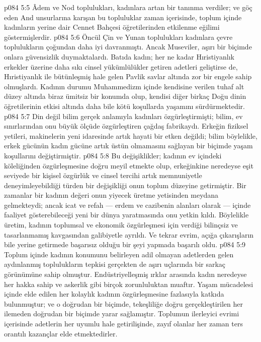 \vs p084 5:5 Âdem ve Nod toplulukları, kadınlara artan bir tanınma verdiler; ve göç eden And unsurlarına karışan bu topluluklar zaman içerisinde, toplum içinde kadınların yerine dair Cennet Bahçesi öğretilerinden etkilenme eğilimi göstermişlerdir.
\vs p084 5:6 Öncül Çin ve Yunan toplulukları kadınlara çevre toplulukların çoğundan daha iyi davranmıştı. Ancak Museviler, aşırı bir biçimde onlara güvensizlik duymaktalardı. Batıda kadın; her ne kadar Hıristiyanlık erkekler üzerine daha sıkı cinsel yükümlülükler getiren adetleri geliştirse de, Hıristiyanlık ile bütünleşmiş hale gelen Pavlik savlar altında zor bir engele sahip olmuşlardı. Kadının durumu Muhammedizm içinde kendisine verilen tuhaf alt düzey altında biraz ümitsiz bir konumda olup, kendisi diğer birkaç Doğu dinin öğretilerinin etkisi altında daha bile kötü koşullarda yaşamını sürdürmektedir.
\vs p084 5:7 Din değil bilim gerçek anlamıyla kadınları özgürleştirmişti; bilim, ev sınırlarından onu büyük ölçüde özgürleştiren çağdaş fabrikaydı. Erkeğin fiziksel yetileri, makinelerin yeni idaresinde artık hayati bir etken değildi; bilim böylelikle, erkek gücünün kadın gücüne artık üstün olmamasını sağlayan bir biçimde yaşam koşullarını değiştirmiştir.
\vs p084 5:8 Bu değişiklikler; kadının ev içindeki köleliğinden özgürleşmesine doğru meyil etmekte olup, erkeğinkine neredeyse eşit seviyede bir kişisel özgürlük ve cinsel tercihi artık memnuniyetle deneyimleyebildiği türden bir değişikliği onun toplum düzeyine getirmiştir. Bir zamanlar bir kadının değeri onun yiyecek üretme yetisinden meydana gelmekteydi; ancak icat ve refah --- erdem ve cazibenin alanları olarak --- içinde faaliyet gösterebileceği yeni bir dünya yaratmasında onu yetkin kıldı. Böylelikle üretim, kadının toplumsal ve ekonomik özgürleşmesi için verdiği bilinçsiz ve tasarlanmamış kavgasından galibiyetle ayrıldı. Ve tekrar evrim, açığa çıkarışların bile yerine getirmede başarısız olduğu bir şeyi yapmada başarılı oldu.
\vs p084 5:9 Toplum içinde kadının konumunu belirleyen adil olmayan adetlerden gelen aydınlanmış toplulukların tepkisi gerçekten de aşırı uçlarında bir sarkaç görünümüne sahip olmuştur. Endüstriyelleşmiş ırklar arasında kadın neredeyse her hakka sahip ve askerlik gibi birçok zorunluluktan muaftır. Yaşam mücadelesi içinde elde edilen her kolaylık kadının özgürleşmesine fazlasıyla katkıda bulunmuştur; ve o doğrudan bir biçimde, tekeşliliğe doğru gerçekleştirilen her ilemeden doğrudan bir biçimde yarar sağlamıştır. Toplumun ilerleyici evrimi içerisinde adetlerin her uyumlu hale getirilişinde, zayıf olanlar her zaman ters orantılı kazançlar elde etmektedirler.
